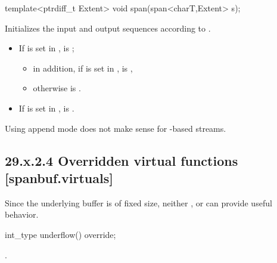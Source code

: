 \documentclass[ebook,11pt,article]{memoir}
\begin{document}
\begin{itemdecl}
template<ptrdiff_t Extent>
void span(span<charT,Extent> s);
\end{itemdecl}

\begin{itemdescr}
\pnum
\effects 
{} Initializes the input and output sequences according to .


\pnum
\postconditions 
\begin{itemize}
\item If  is set in , 
 \tcode{\&\&}  is ; 
\begin{itemize}
\item in addition, 
if  is set in ,
 is , 
\item otherwise  is . 
\end{itemize}
\item If  is set in , 
 \tcode{\&\&}   \tcode{\&\&}  is .
\end{itemize}

\begin{note}
Using append mode does not make sense for -based streams.
\end{note}

\end{itemdescr}

\subsection{29.x.2.4 Overridden virtual functions [spanbuf.virtuals]}
\pnum
\begin{note}
Since the underlying buffer is of fixed size, neither ,  or  can provide useful behavior.
\end{note}

\begin{itemdecl}
int_type underflow() override;
\end{itemdecl}

\begin{itemdescr}
\pnum
\returns
.
\end{itemdescr}
\end{document}
